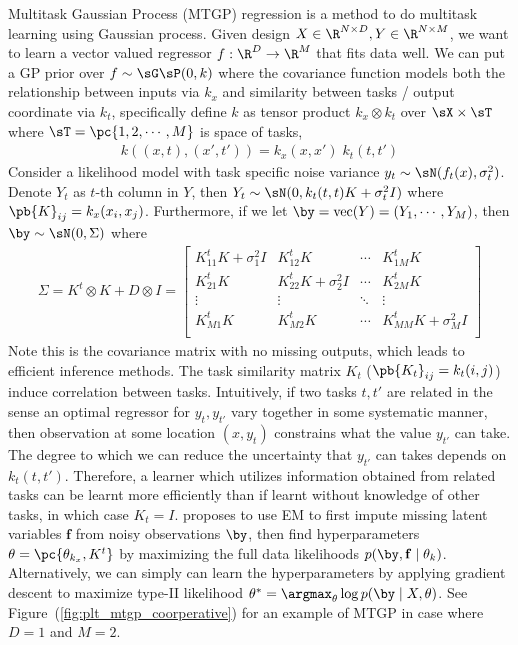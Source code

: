\documentclass[11pt]{article}
\begin{document}
Multitask Gaussian Process (MTGP) regression \cite{bonillaMultitaskGaussianProcess2008} is a method to do multitask learning using Gaussian process. Given design $X\in\R^{N\times D}, Y\in\R^{N\times M}$, we want to learn a vector valued regressor $f:\R^D\to\R^M$ that fits data well. We can put a GP prior over $f \sim \sG\sP(0,k)$ where the covariance function models both the relationship between inputs via $k_x$ and similarity between tasks / output coordinate via $k_t$, specifically define $k$ as tensor product $k_x\otimes k_t$ over $\sX\times\sT$ where $\sT = \pc{1,2,\cdots,M}$ is space of tasks,
\begin{align}
    k((x,t),(x',t')) = k_x(x,x')\; k_t(t,t')
\end{align}
Consider a likelihood model with task specific noise variance $y_t \sim \sN( f_t(x), \sigma_t^2 )$. Denote $Y_t$ as $t$-th column in $Y$, then $Y_t \sim \sN( 0,  k_t(t,t) K + \sigma_t^2 I )$ where $\pb{K}_{ij} = k_x(x_i,x_j)$. Furthermore, if we let $\by = \text{vec}(Y) = (Y_1,\cdots,Y_M)$, then $\by \sim \sN(0,\Sigma)$ where
\begin{align}
    \Sigma = 
    K^t \otimes K + D \otimes I
    = 
    \begin{bmatrix}
        K^t_{11} K + \sigma_1^2 I & K^t_{12} K & \cdots & K^t_{1M} K \\ 
        K^t_{21} K & K^t_{22}K + \sigma_2^2 I & \cdots & K^t_{2M} K \\ 
        \vdots & \vdots & \ddots & \vdots \\
        K^t_{M1} K & K^t_{M2}K  & \cdots & K^t_{MM} K + \sigma_M^2 I \\
    \end{bmatrix}
\end{align}
Note this is the covariance matrix with no missing outputs, which leads to efficient inference methods. The task similarity matrix $K_t$ ($\pb{K_t}_{ij} = k_t(i,j)$) induce correlation between tasks. Intuitively, if two tasks $t,t'$ are related in the sense an optimal regressor for $y_t,y_{t'}$ vary together in some systematic manner, then observation at some location $(x,y_t)$ constrains what the value $y_{t'}$ can take. The degree to which we can reduce the uncertainty that $y_{t'}$ can takes depends on $k_t(t,t')$. Therefore, a learner which utilizes information obtained from related tasks can be learnt more efficiently than if learnt without knowledge of other tasks, in which case $K_t = I$. \cite{bonillaMultitaskGaussianProcess2008} proposes to use EM to first impute missing latent variables $\mathbf{f}$ from noisy observations $\by$, then find hyperparameters $\theta = \pc{ \theta_{k_x}, K^t }$ by maximizing the full data likelihoods $p(\by,\mathbf{f} \mid \theta_{k})$. Alternatively, we can simply can learn the hyperparameters by applying gradient descent to maximize type-II likelihood $\theta^* = \argmax_{\theta} \log p(\by\mid X, \theta)$. See Figure~(\ref{fig:plt_mtgp_coorperative}) for an example of MTGP in case where $D=1$ and $M=2$.
\end{document}
